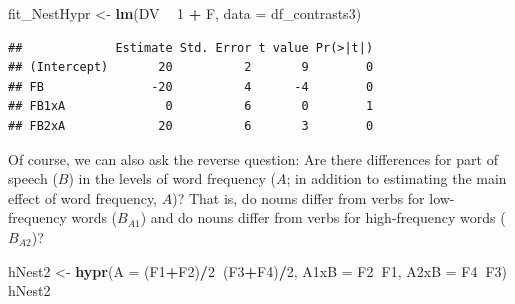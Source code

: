 \documentclass[12pt,]{krantz}
\newenvironment{Shaded}{\begin{snugshade}}{\end{snugshade}}
\newcommand{\DataTypeTok}[1]{\textcolor[rgb]{0.13,0.29,0.53}{#1}}
\newcommand{\DecValTok}[1]{\textcolor[rgb]{0.00,0.00,0.81}{#1}}
\newcommand{\KeywordTok}[1]{\textcolor[rgb]{0.13,0.29,0.53}{\textbf{#1}}}
\newcommand{\NormalTok}[1]{#1}
\newcommand{\OperatorTok}[1]{\textcolor[rgb]{0.81,0.36,0.00}{\textbf{#1}}}
\newcommand{\StringTok}[1]{\textcolor[rgb]{0.31,0.60,0.02}{#1}}
\begin{document}
\begin{Shaded}
\end{Shaded}

\begin{Shaded}
\begin{Highlighting}[]
\NormalTok{fit_NestHypr <-}\StringTok{ }\KeywordTok{lm}\NormalTok{(DV }\OperatorTok{~}\StringTok{ }\DecValTok{1} \OperatorTok{+}\StringTok{ }\NormalTok{F,}
                 \DataTypeTok{data =}\NormalTok{ df_contrasts3) }
\end{Highlighting}
\end{Shaded}

\begin{Shaded}
\end{Shaded}

\begin{verbatim}
##             Estimate Std. Error t value Pr(>|t|)
## (Intercept)       20          2       9        0
## FB               -20          4      -4        0
## FB1xA              0          6       0        1
## FB2xA             20          6       3        0
\end{verbatim}

Of course, we can also ask the reverse question: Are there differences for part of speech (\(B\)) in the levels of word frequency (\(A\); in addition to estimating the main effect of word frequency, \(A\))? That is, do nouns differ from verbs for low-frequency words (\(B_{A1}\)) and do nouns differ from verbs for high-frequency words (\(B_{A2}\))?

\begin{Shaded}
\begin{Highlighting}[]
\NormalTok{hNest2 <-}\StringTok{ }\KeywordTok{hypr}\NormalTok{(}\DataTypeTok{A    =}\NormalTok{ (F1}\OperatorTok{+}\NormalTok{F2)}\OperatorTok{/}\DecValTok{2}\OperatorTok{~}\NormalTok{(F3}\OperatorTok{+}\NormalTok{F4)}\OperatorTok{/}\DecValTok{2}\NormalTok{,}
               \DataTypeTok{A1xB =}\NormalTok{ F2}\OperatorTok{~}\NormalTok{F1,}
               \DataTypeTok{A2xB =}\NormalTok{ F4}\OperatorTok{~}\NormalTok{F3)}
\NormalTok{hNest2}
\end{Highlighting}
\end{Shaded}
\end{document}
